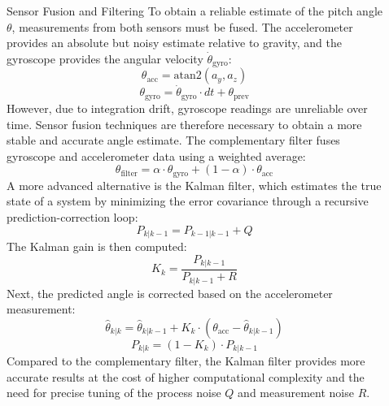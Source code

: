 \documentclass[final]{beamer}
\newlength{\sepwidth}
\newlength{\colwidth}
\newcommand{\separatorcolumn}{\begin{column}{\sepwidth}\end{column}}
\begin{document}
\begin{frame}[t]
\begin{columns}[t]
\begin{column}{\colwidth}
\begin{alertblock}{Sensor Fusion and Filtering}
	  To obtain a reliable estimate of the pitch angle \( \theta \), measurements from both sensors must be fused. The accelerometer provides an absolute but noisy estimate relative to gravity, and the gyroscope provides the angular velocity \( \dot{\theta}_{\text{gyro}} \):
\[
\theta_{\text{acc}} = \text{atan2}(a_y, a_z)
\]
\[
\theta_{\text{gyro}} = \dot{\theta}_{\text{gyro}} \cdot dt + \theta_{\text{prev}}
\]
However, due to integration drift, gyroscope readings are unreliable over time. Sensor fusion techniques are therefore necessary to obtain a more stable and accurate angle estimate.
The complementary filter fuses gyroscope and accelerometer data using a weighted average:
\[
\theta_{\text{filter}} = \alpha \cdot \theta_{\text{gyro}} + (1 - \alpha) \cdot \theta_{\text{acc}}
\]
A more advanced alternative is the Kalman filter, which estimates the true state of a system by minimizing the error covariance through a recursive prediction-correction loop:
\[
P_{k|k-1} = P_{k-1|k-1} + Q
\]
The Kalman gain is then computed:
\[
K_k = \frac{P_{k|k-1}}{P_{k|k-1} + R}
\]
Next, the predicted angle is corrected based on the accelerometer measurement:
\[
\hat{\theta}_{k|k} = \hat{\theta}_{k|k-1} + K_k \cdot (\theta_{\text{acc}} - \hat{\theta}_{k|k-1})
\]
\[
P_{k|k} = (1 - K_k) \cdot P_{k|k-1}
\]
Compared to the complementary filter, the Kalman filter provides more accurate results at the cost of higher computational complexity and the need for precise tuning of the process noise \( Q \) and measurement noise \( R \).

\end{alertblock}

\end{column}

\separatorcolumn

\begin{column}{\colwidth}


\end{column}
\end{columns}
\end{frame}
\end{document}
